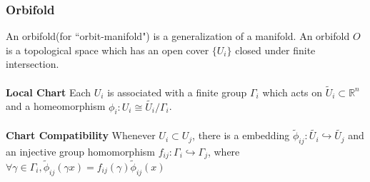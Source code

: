 \documentclass{beamer}
\begin{document}
\begin{frame}
\frametitle{Orbifold}
An orbifold(for ``orbit-manifold") is a generalization of a manifold. An orbifold $\mathit{O}$ is a topological space which has an  open cover $\{U_i\}$ closed under finite intersection.\\
~\\
\textbf{Local Chart} Each $U_i$ is associated with a finite group $\Gamma_i$ which acts on $\tilde{U}_i\subset \mathbb{R}^n$ and a homeomorphism $\phi_i: U_i \cong \tilde{U_i} / \Gamma_i$.\\
~\\
\textbf{Chart Compatibility} Whenever $U_i \subset U_j$, there is a embedding $\tilde{\phi}_{ij}: \tilde{U_i} \hookrightarrow \tilde{U_j}$ and an injective group homomorphism $f_{ij}: \Gamma_i \hookrightarrow \Gamma_j$, where $\forall \gamma \in \Gamma_i, \tilde{\phi}_{ij}(\gamma x) = f_{ij}(\gamma)\tilde{\phi}_{ij}(x)$\\
~\\
\end{frame}

\end{document}
